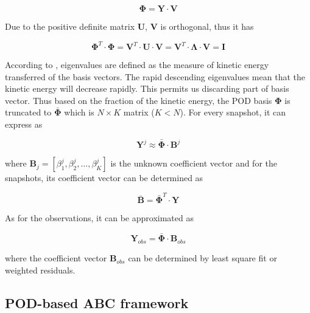 \documentclass[review]{elsarticle}
\begin{document}
\begin{equation}
\label{eq:PODbasis}
\mathbf{\Phi} = \mathbf{Y}\cdot \mathbf{V}
\end{equation}

Due to the positive definite matrix $\mathbf{U}$, $\mathbf{V}$ is orthogonal, thus it has

\begin{equation}
\label{eq:orthogonal}
\mathbf{\Phi}^T \cdot \mathbf{\Phi}
= \mathbf{V}^T \cdot \mathbf{U} \cdot \mathbf{V} =\mathbf{V}^T \cdot \mathbf{\Lambda} \cdot \mathbf{V}= \mathbf{I}
\end{equation}

According to \cite{berkooz1993proper}, eigenvalues are defined as the measure of kinetic energy transferred of the basis vectors. The rapid descending eigenvalues mean that the kinetic energy will decrease rapidly. This permits us discarding part of basis vector. Thus based on the fraction of the kinetic energy, the POD basis $\mathbf{\Phi}$ is truncated to $\mathbf{\bar{\Phi}}$ which is $N \times K$ matrix ($K < N$). For every snapshot, it can express as 

\begin{equation}
\label{eq:PODtrunaxted}
\mathbf{Y} ^ j \approx  \mathbf{\bar{\Phi}} \cdot \mathbf{B}^j
\end{equation}

\noindent where $\mathbf{B}_j = [\beta_1^j,\beta_2^j,\ldots,\beta_K^j ]$ is the unknown coefficient vector and for the snapshots, its coefficient vector can be determined as 

\begin{equation}
\label{eq:coefficient of POD}
\mathbf{\bar{B}} = \mathbf{\bar{\Phi}}^T \cdot \mathbf{Y}
\end{equation}

As for the observations, it can be approximated as

\begin{equation}
\label{eq:observation of POD}
\mathbf{Y}_{obs} = \mathbf{\bar{\Phi}} \cdot \mathbf{B}_{obs}
\end{equation}

\noindent where the coefficient vector $\mathbf{B}_{obs}$ can be determined by least square fit or weighted residuals. 

\subsection{POD-based ABC framework}
\end{document}

